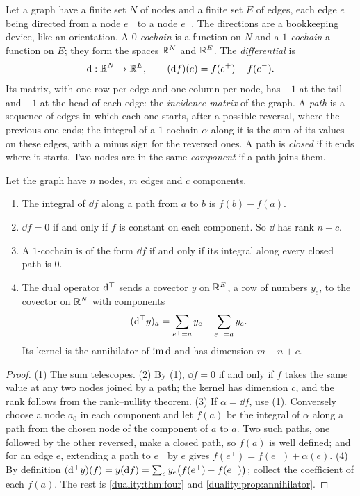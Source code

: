 \begin{notechapter}
Let a graph have a finite set $N$ of nodes and a finite set $E$ of
edges, each edge $e$ being directed from a node $e^-$ to a node $e^+$.
The directions are a bookkeeping device, like an orientation. A
\emph{$0$-cochain} is a function on $N$ and a \emph{$1$-cochain} a
function on $E$; they form the spaces $\mathbb{R}^N$ and $\mathbb{R}^E$. The
\emph{differential} is
\[
  \mathrm{d}:\mathbb{R}^N\to\mathbb{R}^E , \qquad (\mathrm{d} f)(e) = f(e^+) - f(e^-) .
\]
Its matrix, with one row per edge and one column per node, has $-1$ at
the tail and $+1$ at the head of each edge: the \emph{incidence matrix}
of the graph. A \emph{path} is a sequence of edges in which each one
starts, after a possible reversal, where the previous one ends; the
integral of a $1$-cochain $\alpha$ along it is the sum of its values on
these edges, with a minus sign for the reversed ones. A path is
\emph{closed} if it ends where it starts. Two nodes are in the same
\emph{component} if a path joins them.

\begin{proposition}\label{stokes:prop:graph}
Let the graph have $n$ nodes, $m$ edges and $c$ components.
\begin{enumerate}[nosep]
  \item The integral of $\dd f$ along a path from $a$ to $b$ is
        $f(b) - f(a)$.
  \item $\dd f = 0$ if and only if $f$ is constant on each component.
        So $\dd$ has rank $n - c$.
  \item A $1$-cochain is of the form $\dd f$ if and only if its
        integral along every closed path is $0$.
  \item The dual operator $\mathrm{d}^{\top}$ sends a covector $y$ on $\mathbb{R}^E$, a
        row of numbers $y_e$, to the covector on $\mathbb{R}^N$ with components
        \[
          (\mathrm{d}^{\top} y)_a = \sum_{e^+ = a}y_e - \sum_{e^- = a}y_e .
        \]
        Its kernel is the annihilator of $\operatorname{im}\mathrm{d}$ and has dimension
        $m - n + c$.
\end{enumerate}
\end{proposition}

\begin{proof}
(1) The sum telescopes. (2) By (1), $\dd f = 0$ if and only if $f$ takes
the same value at any two nodes joined by a path; the kernel has
dimension $c$, and the rank follows from the rank--nullity theorem.
(3) If $\alpha = \dd f$, use (1). Conversely choose a node $a_0$ in
each component and let $f(a)$ be the integral of $\alpha$ along a path
from the chosen node of the component of $a$ to $a$. Two such paths,
one followed by the other reversed, make a closed path, so $f(a)$ is
well defined; and for an edge $e$, extending a path to $e^-$ by $e$
gives $f(e^+) = f(e^-) + \alpha(e)$. (4) By definition
$(\mathrm{d}^{\top} y)(f) = y(\mathrm{d} f) = \sum_ey_e\bigl(f(e^+) - f(e^-)\bigr)$;
collect the coefficient of each $f(a)$. The rest is
\cref{duality:thm:four} and \cref{duality:prop:annihilator}.
\end{proof}


\end{notechapter}
